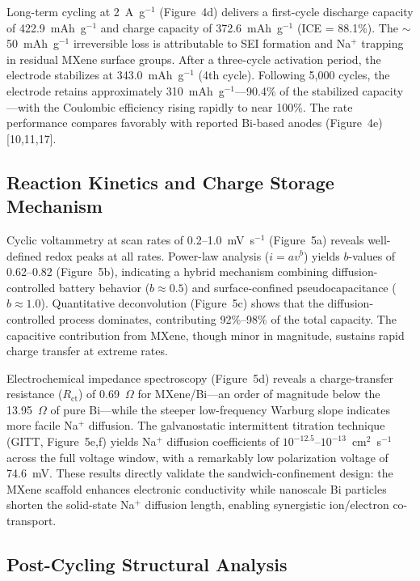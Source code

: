 Long-term cycling at 2~A~g$^{-1}$ (Figure~4d) delivers a first-cycle discharge capacity of 422.9~mAh~g$^{-1}$ and charge capacity of 372.6~mAh~g$^{-1}$ (ICE = 88.1\%). The $\sim$50~mAh~g$^{-1}$ irreversible loss is attributable to SEI formation and Na$^{+}$ trapping in residual MXene surface groups. After a three-cycle activation period, the electrode stabilizes at 343.0~mAh~g$^{-1}$ (4th cycle). Following 5,000 cycles, the electrode retains approximately 310~mAh~g$^{-1}$---90.4\% of the stabilized capacity---with the Coulombic efficiency rising rapidly to near 100\%. The rate performance compares favorably with reported Bi-based anodes (Figure~4e) [10,11,17].

\subsection{Reaction Kinetics and Charge Storage Mechanism}

Cyclic voltammetry at scan rates of 0.2--1.0~mV~s$^{-1}$ (Figure~5a) reveals well-defined redox peaks at all rates. Power-law analysis ($i = av^{b}$) yields $b$-values of 0.62--0.82 (Figure~5b), indicating a hybrid mechanism combining diffusion-controlled battery behavior ($b \approx 0.5$) and surface-confined pseudocapacitance ($b \approx 1.0$). Quantitative deconvolution (Figure~5c) shows that the diffusion-controlled process dominates, contributing 92\%--98\% of the total capacity. The capacitive contribution from MXene, though minor in magnitude, sustains rapid charge transfer at extreme rates.

Electrochemical impedance spectroscopy (Figure~5d) reveals a charge-transfer resistance ($R_{\text{ct}}$) of 0.69~$\Omega$ for MXene/Bi---an order of magnitude below the 13.95~$\Omega$ of pure Bi---while the steeper low-frequency Warburg slope indicates more facile Na$^{+}$ diffusion. The galvanostatic intermittent titration technique (GITT, Figure~5e,f) yields Na$^{+}$ diffusion coefficients of $10^{-12.5}$--$10^{-13}$~cm$^{2}$~s$^{-1}$ across the full voltage window, with a remarkably low polarization voltage of 74.6~mV. These results directly validate the sandwich-confinement design: the MXene scaffold enhances electronic conductivity while nanoscale Bi particles shorten the solid-state Na$^{+}$ diffusion length, enabling synergistic ion/electron co-transport.

\subsection{Post-Cycling Structural Analysis}

